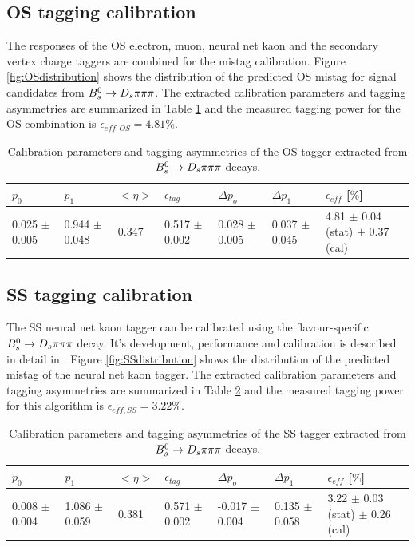 \subsection{OS tagging calibration}
\label{subsec: OScalibration}
The responses of the OS electron, muon, neural net kaon and the secondary vertex charge taggers are combined for the mistag calibration. 
Figure \ref{fig:OSdistribution} shows the distribution of the predicted OS mistag for signal candidates from ${{B}^0_{s}}\rightarrow{\ensuremath{{D}_{s}}}{\ensuremath{\pi}}{\ensuremath{\pi}}{\ensuremath{\pi}}$. 
The extracted calibration parameters and tagging asymmetries are summarized in Table \ref{table: OScalibration} and the measured tagging power for the OS combination is $\epsilon_{eff,OS} = 4.81 \%$.


\begin{table}[h]
\centering
\scriptsize
 \begin{tabular}{l l l l | l l | l}
\hline
$p_{0}$ & $p_{1}$ & $<\eta>$ & $\epsilon_{tag}$ & $\Delta p_{o}$ & $\Delta p_{1}$ & $\epsilon_{eff}$ [$\%$] \\
\hline
0.025 $\pm$0.005  & 0.944 $\pm$ 0.048 & 0.347 & 0.517 $\pm$ 0.002 & 0.028 $\pm$ 0.005 & 0.037 $\pm$ 0.045 & 4.81 $\pm$ 0.04 (stat) $\pm$ 0.37 (cal) \\
\hline
\end{tabular}
\caption{Calibration parameters and tagging asymmetries of the OS tagger extracted from ${{B}^0_{s}}\rightarrow{\ensuremath{{D}_{s}}}{\ensuremath{\pi}}{\ensuremath{\pi}}{\ensuremath{\pi}}$ decays.}
\label{table: OScalibration}
\normalsize
\end{table}


\subsection{SS tagging calibration}
\label{subsec: SScalibration}
The SS neural net kaon tagger can be calibrated using the flavour-specific ${{B}^0_{s}}\rightarrow{\ensuremath{{D}_{s}}}{\ensuremath{\pi}}{\ensuremath{\pi}}{\ensuremath{\pi}}$ decay. It's development, performance and calibration is described in detail in \cite{Aaij:2016psi}. 
Figure \ref{fig:SSdistribution} shows the distribution of the predicted mistag of the neural net kaon tagger. 
The extracted calibration parameters and tagging asymmetries are summarized in Table \ref{table: SScalibration} and the measured tagging power for this algorithm is $\epsilon_{eff,SS} = 3.22  \%$.

\begin{table}[h]
\centering
\scriptsize
 \begin{tabular}{l l l l | l l | l}
\hline
$p_{0}$ & $p_{1}$ & $<\eta>$ & $\epsilon_{tag}$ & $\Delta p_{o}$ & $\Delta p_{1}$ & $\epsilon_{eff}$ [$\%$] \\
\hline
0.008 $\pm$ 0.004  & 1.086 $\pm$ 0.059 & 0.381 & 0.571 $\pm$ 0.002 & -0.017 $\pm$ 0.004  & 0.135 $\pm$ 0.058 & 3.22 $\pm$ 0.03 (stat) $\pm$ 0.26 (cal) \\
\hline
\end{tabular}
\caption{Calibration parameters and tagging asymmetries of the SS tagger extracted from ${{B}^0_{s}}\rightarrow{\ensuremath{{D}_{s}}}{\ensuremath{\pi}}{\ensuremath{\pi}}{\ensuremath{\pi}}$ decays.}
\label{table: SScalibration}
\normalsize
\end{table}


